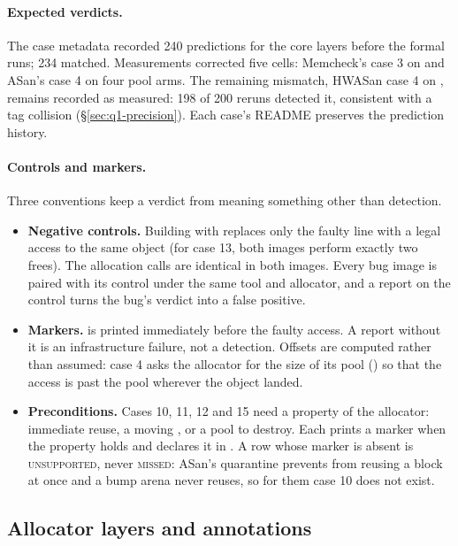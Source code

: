 \paragraph{Expected verdicts.} The case metadata recorded 240 predictions for the core layers before the formal runs; 234 matched. Measurements corrected five cells: Memcheck's case 3 on  and ASan's case 4 on four pool arms. The remaining mismatch, HWASan case 4 on , remains recorded as measured: 198 of 200 reruns detected it, consistent with a tag collision (\S\ref{sec:q1-precision}). Each case's README preserves the prediction history.

\paragraph{Controls and markers.} Three conventions keep a verdict from meaning something other than detection.
\begin{itemize}
\item \textbf{Negative controls.} Building with  replaces only the faulty line with a legal access to the same object (for case 13, both images perform exactly two frees). The allocation calls are identical in both images. Every bug image is paired with its control under the same tool and allocator, and a report on the control turns the bug's verdict into a false positive.
\item \textbf{Markers.}  is printed immediately before the faulty access. A report without it is an infrastructure failure, not a detection. Offsets are computed rather than assumed: case 4 asks the allocator for the size of its pool () so that the access is past the pool wherever the object landed.
\item \textbf{Preconditions.} Cases 10, 11, 12 and 15 need a property of the allocator: immediate reuse, a moving , or a pool to destroy. Each prints a marker when the property holds and declares it in . A row whose marker is absent is \textsc{unsupported}, never
  \textsc{missed}: ASan's quarantine prevents  from reusing a block at once and a bump
arena never reuses, so for them case 10 does not exist.
\end{itemize}

\subsection{Allocator layers and annotations}
\label{sec:allocators}

